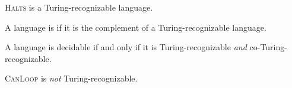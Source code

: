 \documentclass[twoside,letterpaper,openany]{book}
\begin{document}
\begin{stmt}
\textsc{Halts} is a Turing-recognizable language.
\end{stmt}

\begin{defn}
A language is  if it is the complement of a Turing-recognizable language.
\end{defn}

\begin{thm}
A language is decidable if and only if it is Turing-recognizable \emph{and} co-Turing-recognizable.
\end{thm}

\begin{stmt}
\textsc{CanLoop} is \emph{not} Turing-recognizable.
\end{stmt}












\end{document}
